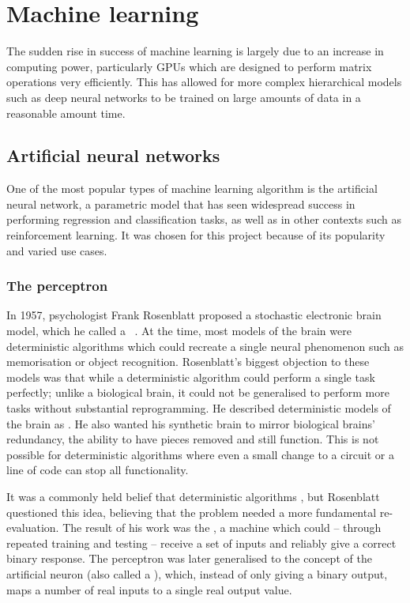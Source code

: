 
\chapter{Machine learning}

The sudden rise in success of machine learning is largely due to an increase in computing power, particularly \acp{GPU} which are designed to perform matrix operations very efficiently.
This has allowed for more complex hierarchical models such as deep neural networks to be trained on large amounts of data in a reasonable amount time.

\section{Artificial neural networks}

One of the most popular types of machine learning algorithm is the artificial neural network, a parametric model that has seen widespread success in performing regression and classification tasks, as well as in other contexts such as reinforcement learning.
It was chosen for this project because of its popularity and varied use cases.

\subsection{The perceptron}

In 1957, psychologist Frank Rosenblatt proposed a stochastic electronic brain model, which he called a ~\autocite{rosenblatt1957}.
At the time, most models of the brain were deterministic algorithms which could recreate a single neural phenomenon such as memorisation or object recognition.
Rosenblatt's biggest objection to these models was that while a deterministic algorithm could perform a single task perfectly; unlike a biological brain, it could not be generalised to perform more tasks without substantial reprogramming.
He described deterministic models of the brain as .
He also wanted his synthetic brain to mirror biological brains' redundancy, the ability to have pieces removed and still function.
This is not possible for deterministic algorithms where even a small change to a circuit or a line of code can stop all functionality.

It was a commonly held belief that deterministic algorithms , but Rosenblatt questioned this idea, believing that the problem needed a more fundamental re-evaluation.
The result of his work was the , a machine which could -- through repeated training and testing -- receive a set of inputs and reliably give a correct binary response.
The perceptron was later generalised to the concept of the artificial neuron (also called a ), which, instead of only giving a binary output, maps a number of real inputs to a single real output value.


